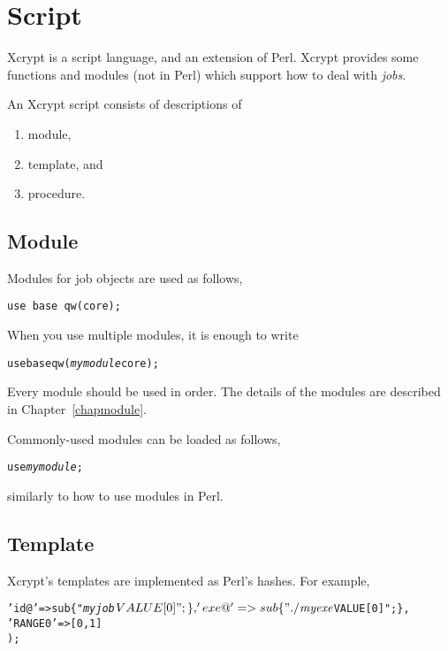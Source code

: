 \documentclass[a4paper,10pt]{report}
\begin{document}
\chapter{Script}

Xcrypt is a script language, and an extension of Perl.  Xcrypt provides
some functions and modules (not in Perl) which support how to deal
with \textit{jobs}.

An Xcrypt script consists of descriptions of
\begin{enumerate}
 \item module,
 \item template, and
 \item procedure.
\end{enumerate}

\section{Module}

Modules for job objects are used as follows,
\begin{boxnote}
\begin{verbatim}
use base qw(core);
\end{verbatim}
\end{boxnote}
\vspace{\baselineskip}

When you use multiple modules, it is enough to write
\begin{boxnote}
\begin{alltt}
use base qw(\textit{mymodule} core);
\end{alltt}
\end{boxnote}
\vspace{\baselineskip}
\noindent
Every module should be used in order.
The details of the modules are described in Chapter~\ref{chapmodule}.

Commonly-used modules can be loaded as follows,
\begin{boxnote}
\begin{alltt}
use \textit{mymodule};
\end{alltt}
\end{boxnote}
\vspace{\baselineskip}
\noindent
similarly to how to use modules in Perl.

\section{Template}

Xcrypt's templates are implemented as Perl's hashes.  For example,
\begin{boxnote}
\begin{alltt}
%template = (
 'id@' => sub \{ "\textit{myjob}$VALUE[0]"; \},
 'exe@' => sub \{ "./\textit{myexe} $VALUE[0]"; \},
 'RANGE0' => [0,1]
);
\end{alltt}
\end{boxnote}
\vspace{\baselineskip}
\end{document}
